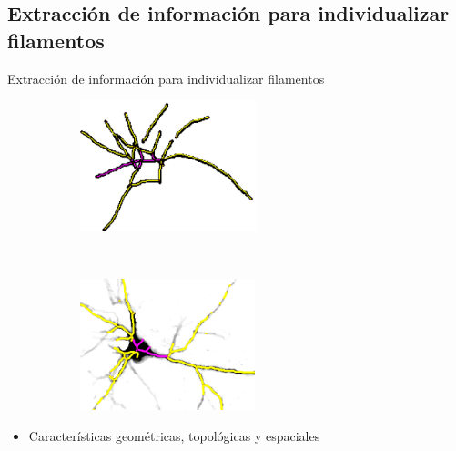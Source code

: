 \subsection{Extracci\'on de informaci\'on para individualizar filamentos}
\begin{frame}{Extracci\'on de informaci\'on para individualizar filamentos}
     \begin{figure}[h!]
    \centering
    \begin{subfigure}[t]{0.48\textwidth}
        \centering
        \includegraphics[height=1.5in]{Pictures/50-ROIs-Spinning-Marchantia-somaEdges.png}
    \end{subfigure}%
    ~ \hspace{0.1cm}
    \begin{subfigure}[t]{0.48\textwidth}
    \centering
        \includegraphics[height=1.5in]{Pictures/Porta18-3a1-somaEdges.png}
    \end{subfigure}
    \end{figure}
    \begin{itemize}
        \item Caracter\'isticas geom\'etricas, topol\'ogicas y espaciales
    \end{itemize}
\end{frame}